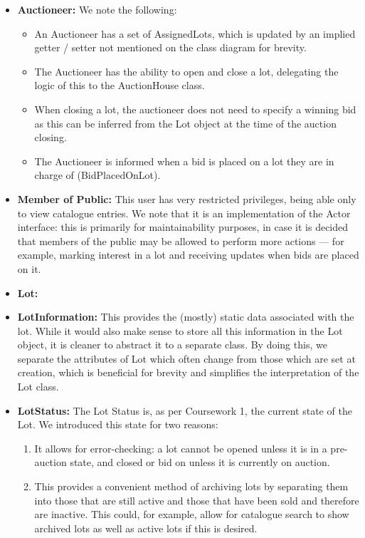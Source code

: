 \documentclass[titlepage, 12pt]{extarticle}
\begin{document}
\begin{itemize}
\begin{itemize}
\begin{enumerate}
    \end{enumerate}
  \end{itemize}
\item {\bf Auctioneer: } We note the following:
  \begin{itemize}
    \item An Auctioneer has a set of AssignedLots, which is updated by an implied getter / setter not mentioned on the class diagram for brevity. 
    \item The Auctioneer has the ability to open and close a lot, delegating the logic of this to the AuctionHouse class. 
    \item When closing a lot, the auctioneer does not need to specify a winning bid as this can be inferred from the Lot object at the time of the auction closing. 
    \item The Auctioneer is informed when a bid is placed on a lot they are in charge of (BidPlacedOnLot). 
  \end{itemize}
\item {\bf Member of Public: } This user has very restricted privileges, being able only to view catalogue entries. We note that it is an implementation of the Actor interface: this is primarily for maintainability purposes, in case it is decided that members of the public may be allowed to perform more actions --- for example, marking interest in a lot and receiving updates when bids are placed on it.
\item {\bf Lot: } 
\item {\bf LotInformation: } This provides the (mostly) static data associated with the lot. While it would also make sense to store all this information in the Lot object, it is cleaner to abstract it to a separate class. By doing this, we separate the attributes of Lot which often change from those which are set at creation, which is beneficial for brevity and simplifies the interpretation of the Lot class. 
\item {\bf LotStatus: } The Lot Status is, as per Coursework 1, the current state of the Lot. We introduced this state for two reasons:
  \begin{enumerate}
    \item It allows for error-checking: a lot cannot be opened unless it is in a pre-auction state, and closed or bid on unless it is currently on auction.
    \item This provides a convenient method of archiving lots by separating them into those that are still active and those that have been sold and therefore are inactive. This could, for example, allow for catalogue search to show archived lots as well as active lots if this is desired.

\end{enumerate}
\end{itemize}
\end{document}
